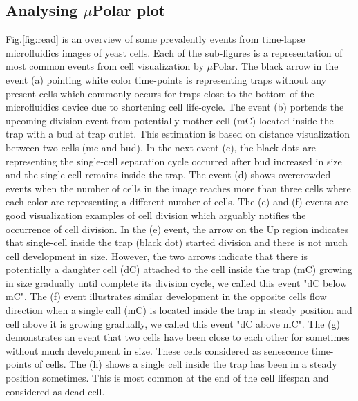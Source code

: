 \documentclass[conference]{IEEEtran}
\begin{document}
\subsection{Analysing $\mu$Polar plot}

 Fig.\ref{fig:read} is an overview of some prevalently events from time-lapse microfluidics images of yeast cells. Each of the sub-figures is a representation of most common events from cell visualization by $\mu$Polar. The black arrow in the event (a) pointing white color time-points is representing traps without any present cells which commonly occurs for traps close to the bottom of the microfluidics device due to shortening cell life-cycle. The event (b) portends the upcoming division event from potentially mother cell (mC) located inside the trap with a bud at trap outlet. This estimation is based on distance visualization between two cells (mc and bud). In the next event (c), the black dots are representing the single-cell separation cycle occurred after bud increased in size and the single-cell remains inside the trap. The event (d) shows overcrowded events when the number of cells in the image reaches more than three cells where each color are representing a different number of cells. The (e) and (f) events are good visualization examples of cell division which arguably notifies the occurrence of cell division. In the (e) event, the arrow on the Up region indicates that single-cell inside the trap (black dot) started division and there is not much cell development in size. However, the two arrows indicate that there is potentially a daughter cell (dC) attached to the cell inside the trap (mC) growing in size gradually until complete its division cycle, we called this event "dC below mC". The (f) event illustrates similar development in the opposite cells flow direction when a single call (mC) is located inside the trap in steady position and cell above it is growing gradually, we called this event "dC above mC". The (g) demonstrates an event that two cells have been close to each other for sometimes without much development in size. These cells considered as senescence time-points of cells. The (h) shows a single cell inside the trap has been in a steady position sometimes. This is most common at the end of the cell lifespan and considered as dead cell.
\end{document}

